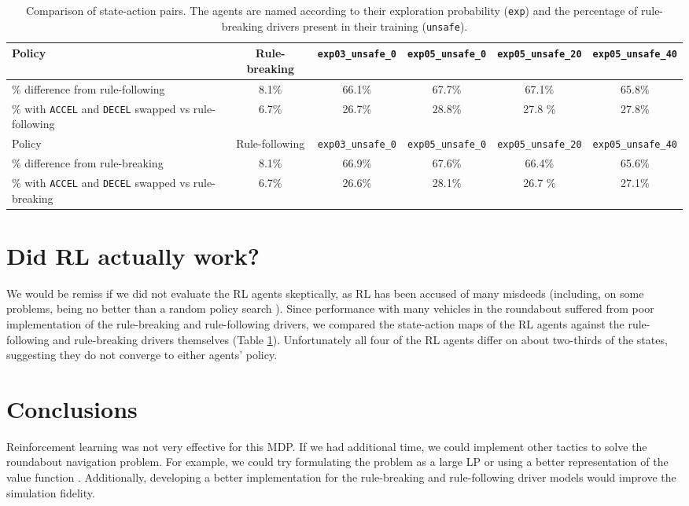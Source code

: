 \documentclass[conference]{IEEEtran}
\begin{document}
\clearpage

\begin{table}
	\begin{minipage}{\textwidth}
		\centering
		\begin{tabular}{|p{8em}|ccccc|}\hline
		Policy & Rule-breaking & \verb|exp03_unsafe_0| & \verb|exp05_unsafe_0| &  \verb|exp05_unsafe_20| &  \verb|exp05_unsafe_40| 
		\\\hline
		\% difference from rule-following & 8.1\% & 66.1\% & 67.7\% &67.1\% & 65.8\%
		\\
		\% with \verb|ACCEL| and \verb|DECEL| swapped vs rule-following & 6.7\% &
		26.7\% & 28.8\% &27.8 \% & 27.8\%
			\\\hline
		Policy & Rule-following & \verb|exp03_unsafe_0| & \verb|exp05_unsafe_0| &  \verb|exp05_unsafe_20| &  \verb|exp05_unsafe_40| 
		\\\hline
		\% difference from rule-breaking & 8.1\% & 66.9\% & 67.6\% &66.4\% &
		65.6\%
	\\
		\% with \verb|ACCEL| and \verb|DECEL| swapped vs rule-breaking & 6.7\% &
26.6\% & 28.1\% &26.7 \% & 27.1\%
\\\hline
		\end{tabular}
		\caption{Comparison of state-action pairs. The agents are named according to their exploration probability (\texttt{exp}) and the percentage of rule-breaking drivers present in their training (\texttt{unsafe}).}
		\label{tab:comparison}
	\end{minipage}
\end{table}

\section{Did RL actually work?} We would be remiss if we did not evaluate the RL agents skeptically, as RL has been accused of many misdeeds (including, on some problems, being no better than a random policy search \cite{mania2018simple}).
Since performance with many vehicles in the roundabout suffered from poor implementation of the rule-breaking and rule-following drivers, we compared the state-action maps of the RL agents against the rule-following and rule-breaking drivers themselves (Table \ref{tab:comparison}). Unfortunately all four of the RL agents differ on about two-thirds of the states, suggesting they do not converge to either agents' policy.


\section*{Conclusions}
Reinforcement learning was not very effective for this MDP. If we had additional time, we could implement other tactics to solve the roundabout navigation problem. For example, we could try formulating the problem as a large LP or using a better representation of the value function \cite{kochenderfer2022algorithmsch7}. Additionally, developing a better implementation for the rule-breaking and rule-following driver models would improve the simulation fidelity.
\end{document}
